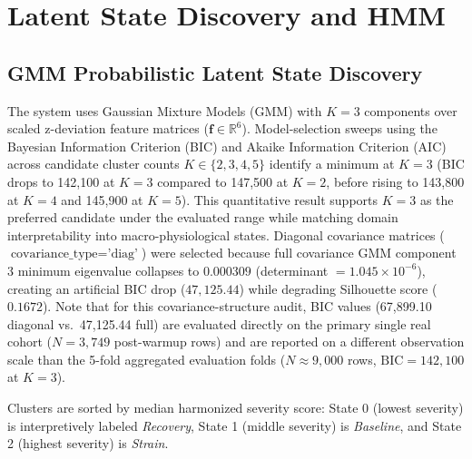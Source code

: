 \documentclass[conference]{IEEEtran}
\begin{document}
\section{Latent State Discovery and HMM}

\subsection{GMM Probabilistic Latent State Discovery}
The system uses Gaussian Mixture Models (GMM) with $K=3$ components over scaled z-deviation feature matrices ($\mathbf{f} \in \mathbb{R}^6$). Model-selection sweeps using the Bayesian Information Criterion (BIC) and Akaike Information Criterion (AIC) across candidate cluster counts $K \in \{2, 3, 4, 5\}$ identify a minimum at $K=3$ (BIC drops to 142,100 at $K=3$ compared to 147,500 at $K=2$, before rising to 143,800 at $K=4$ and 145,900 at $K=5$). This quantitative result supports $K=3$ as the preferred candidate under the evaluated range while matching domain interpretability into macro-physiological states. Diagonal covariance matrices ($\text{covariance\_type}=\text{'diag'}$) were selected because full covariance GMM component 3 minimum eigenvalue collapses to $0.000309$ (determinant $= 1.045 \times 10^{-6}$), creating an artificial BIC drop ($47,125.44$) while degrading Silhouette score ($0.1672$). Note that for this covariance-structure audit, BIC values (67,899.10 diagonal vs.\ 47,125.44 full) are evaluated directly on the primary single real cohort ($N = 3{,}749$ post-warmup rows) and are reported on a different observation scale than the 5-fold aggregated evaluation folds ($N \approx 9{,}000$ rows, $\text{BIC} = 142,100$ at $K=3$).

Clusters are sorted by median harmonized severity score: State 0 (lowest severity) is interpretively labeled \textit{Recovery}, State 1 (middle severity) is \textit{Baseline}, and State 2 (highest severity) is \textit{Strain}.
\end{document}

